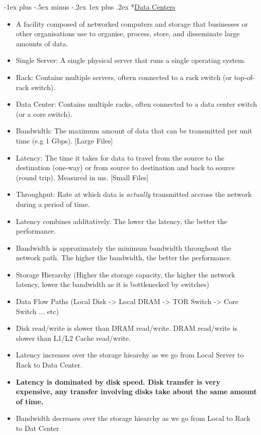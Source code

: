 \documentclass[10pt, landscape]{article}
\makeatletter
\renewcommand{\subsubsection}{\@startsection{subsubsection}{3}{0mm}%
  {-1ex plus -.5ex minus -.2ex}%
  {1ex plus .2ex}%
{\normalfont\small\bfseries}}%
\makeatother
\begin{document}
\begin{multicols*}{4}
  \subsubsection*{\underline{Data Centers}}
  \begin{itemize}
    \item A facility composed of networked computers and storage that businesses or other organisations use to organise, process, store, and disseminate large amounts of data.
    \item Single Server: A single physical server that runs a single operating system.
    \item Rack: Contains multiple servers, oftern connected to a rack switch (or top-of-rack switch).
    \item Data Center: Contains multiple racks, often connected to a data center switch (or a core switch).
    \item Bandwidth: The maximum amount of data that can be transmitted per unit time (e.g 1 Gbps). [Large Files]
    \item Latency: The time it takes for data to travel from the source to the destination (one-way) or from source to destination and back to source (round trip). Measured in ms.  [Small Files]
    \item Throughput: Rate at which data is \textit{actually} transmitted accross the network during a period of time.
    \item Latency combines additatively. The lower the latency, the better the performance.
    \item Bandwidth is approximately the minimum bandwidth throughout the network path. The higher the bandwidth, the better the performance.
    \item Storage Hierarchy (Higher the storage capacity, the higher the network latency, lower the bandwidth as it is bottlenecked by switches)
    \item Data Flow Paths (Local Disk -> Local DRAM -> TOR Switch -> Core Switch ... etc)
    \item Disk read/write is slower than DRAM read/write. DRAM read/write is slower than L1/L2 Cache read/write.
    \item Latency increases over the storage hiearchy as we go from Local Server to Rack to Data Center.
    \item \textbf{Latency is dominated by disk speed. Disk transfer is very expensive, any transfer involving disks take about the same amount of time.}
    \item Bandwidth decreases over the storage hiearchy as we go from Local to Rack to Dat Center

\end{itemize}
\end{multicols*}
\end{document}
